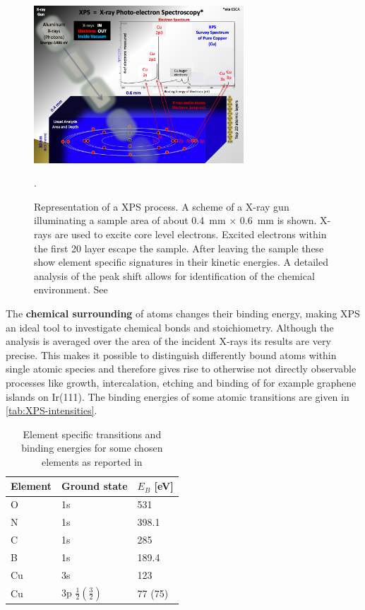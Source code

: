 \begin{figure}\centering
\includegraphics[width=0.7\textwidth]{./images/XPS_PHYSICS}
		\label{fig:XPS-excitation}
	\caption{Representation of a XPS process. A scheme of a X-ray gun illuminating a sample area of about \SI{0.4}{\milli \meter} $\times$ \SI{0.6}{\milli \meter} is shown. X-rays are used to excite core level electrons. Excited electrons within the first 20 layer escape the sample. After leaving the sample these show element specific signatures in their kinetic energies. A detailed analysis of the peak shift allows for identification of the chemical environment. See \cite{noauthor_xps_physics.png_2015}}.
	\label{fig:auger-core}
\end{figure}

The  \textbf{chemical surrounding} of atoms changes their binding energy, making XPS an ideal tool to investigate chemical bonds and stoichiometry. Although the analysis is averaged over the area of the incident X-rays its results are very precise. This makes it possible to distinguish differently bound atoms within single atomic species and therefore gives rise to otherwise not directly observable processes like growth, intercalation, etching and binding of for example 
graphene islands on Ir(111)\cite{busse_graphene_2011-1,granas_oxygen_2012}.
The  binding energies of some atomic transitions are given in \autoref{tab:XPS-intensities}.

\begin{table}\centering
 \caption{Element specific transitions and binding energies for some chosen elements as reported in \cite{wanger_handbook_1979}}
 \begin{tabular}{lll}
  Element & Ground state & $E_B$ [eV]\\ \hline 
  O & 1s & 531\\
  N & 1s & 398.1\\
  C & 1s & 285\\
  B & 1s & 189.4 \\
  Cu & 3s & 123\\
  Cu & 3p $\frac{1}{2} (\frac{3}{2})$ & 77 (75)\\
 \end{tabular}
\label{tab:XPS-intensities}
\end{table}

